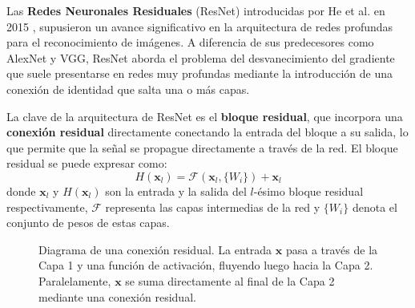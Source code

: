 Las \textbf{Redes Neuronales Residuales} (ResNet) introducidas por He et al. en 2015 \cite{he2016deep}, supusieron un avance significativo en la arquitectura de redes profundas para el reconocimiento de imágenes. A diferencia de sus predecesores como AlexNet y VGG, ResNet aborda el problema del desvanecimiento del gradiente que suele presentarse en redes muy profundas mediante la introducción de una conexión de identidad que salta una o más capas.

La clave de la arquitectura de ResNet es el \textbf{bloque residual}, que incorpora una \textbf{conexión residual} directamente conectando la entrada del bloque a su salida, lo que permite que la señal se propague directamente a través de la red. El bloque residual se puede expresar como:
\begin{equation}
	H(\mathbf{x}_l) = \mathcal{F}(\mathbf{x}_l, \{W_i\}) + \mathbf{x}_l
\end{equation}
donde \(\mathbf{x}_l\) y \(H(\mathbf{x}_l)\) son la entrada y la salida del $l$-ésimo bloque residual respectivamente, \(\mathcal{F}\) representa las capas intermedias de la red y \(\{W_i\}\) denota el conjunto de pesos de estas capas.

\begin{figure}
	\centering
{}
\caption{Diagrama de una conexión residual. La entrada $\mathbf{x}$ pasa a través de la Capa 1 y una función de activación, fluyendo luego hacia la Capa 2. Paralelamente, $\mathbf{x}$ se suma directamente al final de la Capa 2 mediante una conexión residual. }
\end{figure}

